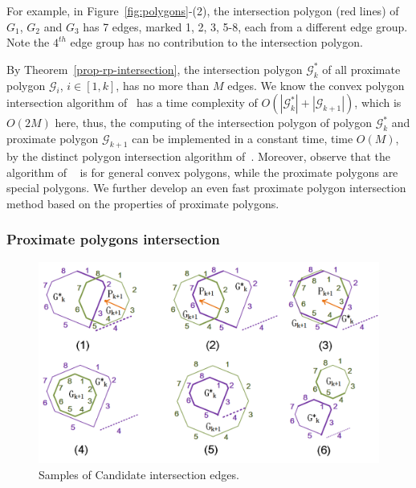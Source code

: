 For example, in Figure~\ref{fig:polygons}-(2), the intersection polygon (red lines) of $G_1$, $G_2$ and $G_3$ has 7 edges, marked 1, 2, 3, 5-8, each from a different edge group. Note the $4^{th}$ edge group has no contribution to the intersection polygon.


By Theorem~\ref{prop-rp-intersection}, the intersection polygon $\mathcal{G}^*_k$ of all proximate polygon $\mathcal{G}_i$, $i \in [1, k]$, has no more than $M$ edges. 
We know the convex polygon intersection algorithm of~\cite{ORourke:Intersection} has a time complexity of $O(|\mathcal{G}^*_k| + |\mathcal{G}_{k+1}|)$, which is $O(2M)$ here, thus, the computing of the intersection polygon of polygon $\mathcal{G}^*_k$ and proximate polygon $\mathcal{G}_{k+1}$ can be implemented in a constant time, \ie time $O(M)$, by the distinct polygon intersection algorithm of~\cite{ORourke:Intersection}.
%
Moreover, observe that the algorithm of ~\cite{ORourke:Intersection} is for general convex polygons, while the proximate polygons are special polygons. We further develop an even fast proximate polygon intersection method based on the properties of proximate polygons.

\subsubsection{Proximate polygons intersection}


\begin{figure}[tb!]
\centering
\includegraphics[scale=0.88]{figures/Fig-poly-edges.png}
\vspace{-1ex}
\caption{\small Samples of Candidate intersection edges.}
\vspace{-2ex}
\label{fig:poly-edges}
\end{figure}

